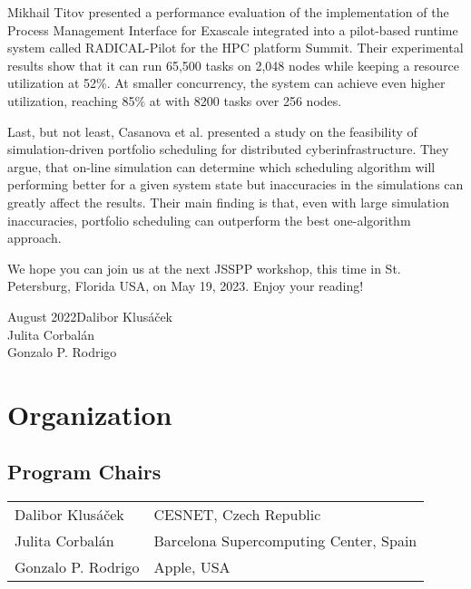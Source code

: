\documentclass{llncs}
\begin{document}
Mikhail Titov presented a performance evaluation of the implementation of the Process Management
Interface for Exascale integrated into a pilot-based runtime system called RADICAL-Pilot for
the HPC platform Summit. Their experimental results show that it can run 65,500 tasks on
2,048 nodes while keeping a resource utilization at 52\%. At smaller concurrency, the system
can achieve even higher utilization, reaching 85\% at with 8200 tasks over 256 nodes.

Last, but not least, Casanova et al. presented a study on the feasibility of simulation-driven
portfolio scheduling for distributed cyberinfrastructure. They argue, that on-line simulation 
can determine which scheduling algorithm will performing better for a given
system state but inaccuracies in the simulations can greatly affect the results. Their
main finding is that, even with large simulation inaccuracies, portfolio scheduling can
outperform the best one-algorithm approach.




We hope you can join us at the next JSSPP workshop, this time in St. Petersburg, Florida USA, on May 19, 2023. Enjoy your reading!

\vspace{1cm}
\begin{flushright}\noindent
August 2022\hfill Dalibor Klus\'{a}\v{c}ek\\
Julita Corbal\'{a}n\\
Gonzalo P. Rodrigo\\
\end{flushright}
%
\chapter*{Organization}
%
\section*{Program Chairs}
\begin{tabular}{@{}p{5cm}@{}p{7.2cm}@{}}
Dalibor Klus\'{a}\v{c}ek &CESNET, Czech Republic\\
Julita Corbal\'{a}n &Barcelona Supercomputing Center, Spain\\
Gonzalo P. Rodrigo &Apple, USA\\
\end{tabular}
%
\end{document}
